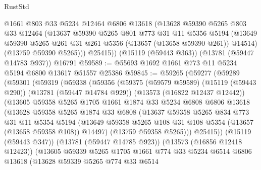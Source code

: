 \begin{lexlean}{RustStd}
\begin{coremodule}
        @1661
        @803
        @33
        @5234
        @12464
        @6806
        @13618
        (@13628
          @59390
          @5265
          @803
          @33
          @12464
          (@13637
            @59390
            @5265
            @801
            @773
            @31
            @11
            @5356
            @5194
            (@13649 @59390 @5265 @261 @31 @261 @5356 (@13657 (@13658 @59390 @261)) @14514)
            (@13759 @59390 @5265)))
        @25415))
    (@15119 (@59443 @363))
    (@13781 (@59447 @14783 @937))
    @16791
@59589 := @55693 @1692 @1661 @773 @11 @5234 @5194 @6800 @13617 @51557 @25386
@59845 := @59265
    (@59277
      (@59289
        (@59301
          (@59319
            (@59338
              (@59356
                (@59375
                  (@59579 @59589)
                  (@15119 (@59443 @290))
                  (@13781 (@59447 @14784 @929))
                  (@13573 (@16822 @12437 @12442))
                  (@13605
                    @59358
                    @5265
                    @1705
                    @1661
                    @1874
                    @33
                    @5234
                    @6808
                    @6806
                    @13618
                    (@13628
                      @59358
                      @5265
                      @1874
                      @33
                      @6808
                      (@13637
                        @59358
                        @5265
                        @834
                        @773
                        @31
                        @11
                        @5354
                        @5194
                        (@13649
                          @59358
                          @5265
                          @108
                          @31
                          @108
                          @5354
                          (@13657 (@13658 @59358 @108))
                          @14497)
                        (@13759 @59358 @5265)))
                    @25415))
                (@15119 (@59443 @347))
                (@13781 (@59447 @14785 @923))
                (@13573 (@16856 @12418 @12423))
                (@13605
                  @59339
                  @5265
                  @1705
                  @1661
                  @774
                  @33
                  @5234
                  @6514
                  @6806
                  @13618
                  (@13628
                    @59339
                    @5265
                    @774
                    @33
                    @6514

\end{coremodule}
\end{lexlean}
